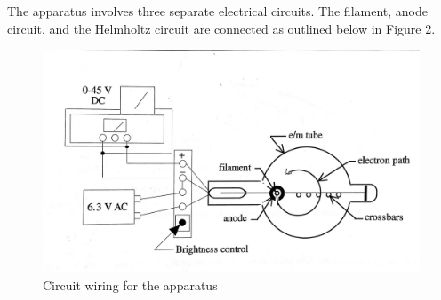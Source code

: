 \documentclass[letterpaper]{article}
\begin{document}
The apparatus involves three separate electrical circuits.
The filament, anode circuit, and the Helmholtz circuit are connected as outlined
below in Figure 2.
\begin{figure}[h!]
    \centering
    \includegraphics[width=.9\textwidth]{fig2.jpg}
    \caption{Circuit wiring for the apparatus \cite{labmanual}}
\end{figure}


%
\end{document}
